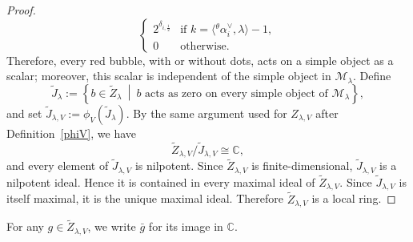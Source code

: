 \documentclass[a4,10pt]{amsart}
\numberwithin{equation}{section}
\theoremstyle{definition}
\newcommand{\thal}{{}^{\theta}\!\alpha}
\newcommand{\old}[1]{{\color{red} #1}}
\begin{document}
\begin{proof}
\[\begin{cases}
        2^{\delta_{i,\frac{1}{2}}} & \text{if } k = \langle \thal^\vee_i, \lambda\rangle - 1,\\
        0 & \text{otherwise}.
    \end{cases}
    \]
Therefore, every red bubble, with or without dots, acts on a simple
object as a scalar; moreover, this scalar is independent of the
simple object in $\mathcal M_\lambda$. Define
\[
\widetilde J_\lambda
:=
\left\{
b\in\widetilde Z_\lambda
\ \middle|\
b\text{ acts as zero on every simple object of }\mathcal M_\lambda
\right\},
\]
and set
\(
\widetilde J_{\lambda,V}
:=
\phi_V(\widetilde J_\lambda)
\).
By the same argument used for $Z_{\lambda,V}$ after 
Definition~\ref{phiV}, we have
\[
\widetilde Z_{\lambda,V}/\widetilde J_{\lambda,V}
\cong \mathbb C,
\]
and every element of $\widetilde J_{\lambda,V}$ is nilpotent.
Since $\widetilde Z_{\lambda,V}$ is finite-dimensional,
$\widetilde J_{\lambda,V}$ is a nilpotent ideal. Hence it is contained
in every maximal ideal of $\widetilde Z_{\lambda,V}$. Since
$\widetilde J_{\lambda,V}$ is itself maximal, it is the unique maximal
ideal. Therefore $\widetilde Z_{\lambda,V}$ is a local ring.

\end{proof}



For any $g\in\tilde Z_{\lambda,V}$,  we write $\bar g$ for its image  in $\mathbb C$.
\end{document}
